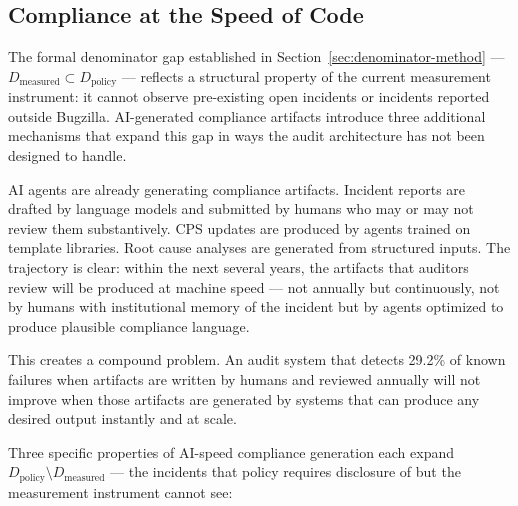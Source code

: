 \documentclass[10pt,twocolumn,letterpaper]{article}
\begin{document}
\subsection{Compliance at the Speed of Code}
\label{sec:ai}

The formal denominator gap established in
Section~\ref{sec:denominator-method} --- $D_\text{measured} \subset
D_\text{policy}$ --- reflects a structural property of the current
measurement instrument: it cannot observe pre-existing open incidents
or incidents reported outside Bugzilla. AI-generated compliance
artifacts introduce three additional mechanisms that expand this gap
in ways the audit architecture has not been designed to handle.

AI agents are already generating compliance artifacts. Incident reports
are drafted by language models and submitted by humans who may or may
not review them substantively. CPS updates are produced by agents
trained on template libraries. Root cause analyses are generated from
structured inputs. The trajectory is clear: within the next several
years, the artifacts that auditors review will be produced at machine
speed --- not annually but continuously, not by humans with institutional
memory of the incident but by agents optimized to produce plausible
compliance language.

This creates a compound problem. An audit system that detects 29.2\% of
known failures when artifacts are written by humans and reviewed annually
will not improve when those artifacts are generated by systems that can
produce any desired output instantly and at scale.

Three specific properties of AI-speed compliance generation each expand
$D_\text{policy} \setminus D_\text{measured}$ --- the incidents that
policy requires disclosure of but the measurement instrument cannot see:
\end{document}
